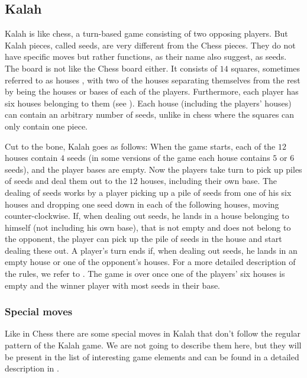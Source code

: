 \subsection{Kalah}

Kalah is like chess, a turn-based game consisting of two opposing
players. But Kalah pieces, called seeds, are very different from the
Chess pieces. They do not have specific moves but rather functions,
as their name also suggest, as seeds. The board is not like the Chess
board either. It consists of $14$ squares, sometimes referred to as houses
\cite{kalahrules}, with two of the houses separating themselves from the
rest by being the houses or bases of each of the players. Furthermore,
each player has six houses belonging to them (see ).
Each house (including the players' houses) can contain an arbitrary
number of seeds, unlike in chess where the squares can only contain one
piece.

Cut to the bone, Kalah goes as follows: When the game starts, each
of the $12$ houses contain $4$ seeds (in some versions of the game
each house contains $5$ or $6$ seeds), and the player bases are empty.
Now the players take turn to pick up piles of seeds and deal them out
to the $12$ houses, including their own base. The dealing of seeds
works by a player picking up a pile of seeds from one of his six houses
and dropping one seed down in each of the following houses, moving
counter-clockwise. If, when dealing out seeds, he lands in a house
belonging to himself (not including his own base), that is not empty
and does not belong to the opponent, the player can pick up the pile of
seeds in the house and start dealing these out. A player's turn ends
if, when dealing out seeds, he lands in an empty house or one of the
opponent's houses. For a more detailed description of the rules, we
refer to \cite{kalahrules}. The game is over once one of the players'
six houses is empty and the winner player with most seeds in their base.


\subsubsection{Special moves}
Like in Chess there are some special moves in Kalah that don't follow the
regular pattern of the Kalah game. We are not going to describe them here, but
they will be present in the list of interesting game elements and can be found
in a detailed description in \cite{kalahrules}.


